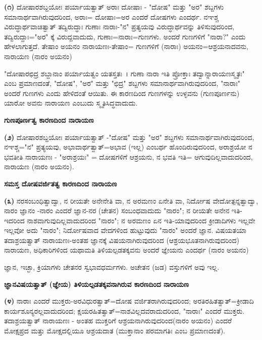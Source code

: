 \smallskip

\textbf{(೧)} ದೋಷಾರಶಬ್ದಯೋಃ ಪರ್ಯಾಯತ್ವಾತ್ ಅರಾಃ ದೋಷಾಃ - "ದೋಷ" ಮತ್ತು "ಅರ" ಶಬ್ದಗಳು ಸಮಾನಾರ್ಥವಾಗಿರುವುದರಿಂದ, ಅರಾಃ= ದೋಷಾಃ=ಅರ ಎಂದರೆ ದೋಷಗಳು ಎಂದರ್ಥ. ನಞಶ್ಚ ವಿರುದ್ಧಾರ್ಥವಾಚಿತ್ವಾತ್ ತದ್ವಿರುದ್ಧಾಃ ಗುಣಾಃ ನಾರಾಃ-\-"ನ" ಪ್ರತ್ಯಯವು ವಿರುದ್ಧಾರ್ಥವನ್ನು ತಿಳಿಸುವುದರಿಂದ, ತದ್ವಿರುದ್ದಾಃ="ಅರ" ಕ್ಕೆ ವಿರುದ್ದವಾದುದು, ಗುಣಾಃ=ನಾರಾಃ=ಗುಣಗಳು. ಅಂದರೆ ಗುಣಗಳಿಗೆ "ನಾರಾ?" ಎಂದು ಹೇಳಲಾಗುತ್ತದೆ. ತೇಷಾಂ ಅಯನಂ ನಾರಾಯಣಃ-ತೇಷಾಂ= ಗುಣಗಳಿಗೆ (ನಾರಾಃ) ಅಯನಂ=ಆಶ್ರಯನಾದವನು, ನಾರಾಯಣ (ನಾರಂ ಅಯನಂ)

"ದೋಷಾರಛಿದ್ರ ಶಬ್ದಾನಾಂ ಪರ್ಯಾಯತ್ವಂ ಯತಸ್ತತಃ~। ಗುಣಾ ನಾರಾ ಇತಿ ಪ್ರೋಕ್ತಾಃ ತದ್ವಾನ್ನಾರಾಯಣಸ್ಮೃತಃ" ಎಂಬ ಪ್ರಮಾಣದಂತೆ, "ದೋಷ", "ಅರ" ಮತ್ತು "ಛಿದ್ರ" ಶಬ್ದಗಳು ಸಮಾನಾರ್ಥವಾಗಿರುವುದರಿಂದ, "ನಾರಾಃ" ಅಂದರೆ ಗುಣಗಳು ಎಂದು ಹೇಳಿದಂತೆ ಆಯಿತು. ಈ ಕಾರಣದಿಂದ ಗುಣಗಳನ್ನು ಉಳ್ಳವನು (ಗುಣಪೂರ್ಣನು) ಯಾರೋ ಅವನು ನಾರಾಯಣ ಎಂಬುದು ಸ್ಮೃತಿಸಿದ್ಧವಾದುದು.

\begin{center}
\textbf{ಗುಣಪೂರ್ಣತ್ವ ಕಾರಣದಿಂದ ನಾರಾಯಣ}
\end{center}

\textbf{(೨)} ದೋಷಾರಶಬ್ದಯೋಃ ಪರ್ಯಾಯತ್ವಾತ್ -"ದೋಷ" ಮತ್ತು "ಅರ" ಶಬ್ದಗಳು ಸಮಾನಾರ್ಥವಾಗಿರುವುದರಿಂದ, ನಞಶ್ಚ="ನ" ಪ್ರತ್ಯಯವು, ಅಭಾವಾರ್ಥತ್ವಾತ್=ಅಭಾವ (ಇಲ್ಲ) ಎಂಬರ್ಥ ಹೊಂದಿರುವುದರಿಂದ, ಅರಾಶ್ರಯೋ ನ ಭವತೀತಿ ನಾರಾಯಣಃ - "ಅರಾಶ್ರಯಃ" = ದೋಷಗಳಿಗೆ ಆಶ್ರಯನು, ನ ಭವತಿ ಇತಿ= ಆಗುವುದಿಲ್ಲವಾದುದರಿಂದ, ನಾರಾಯಣ (ನಾರಂ ಅಯನಂ).

\begin{center}
\textbf{ಸಮಸ್ತ ದೋಷವರ್ಜಿತತ್ವ ಕಾರಣದಿಂದ ನಾರಾಯಣ}
\end{center}

\textbf{(೩)} ನರಸಂಬಂಧಿತ್ವಾದ್ವಾ, ನ ರೀಯತೇ ಅನೇನೇತಿ ವಾ, ನ ಅರಮಣಂ ಏನೇತಿ ವಾ, ನಿರ್ದೋಷ ವೇದೋತ್ಪನ್ನತ್ವಾದ್ವಾ, ನಾರಂ ಜ್ಞಾನಂ -ನಾರಂ ಎಂದರೆ ಜ್ಞಾನ-ನರ (ಚೇತನ) ಸಂಬಂಧವಾದುದು "ನಾರಂ"; ನ ರೀಯತೇ ಅನೇನ ಇತಿ-ಇದರಿಂದ ನಾಶವಾಗುವುದಿಲ್ಲವಾದುದರಿಂದ "ನಾರಂ"; ನ ಅರಮಣಂ ಏನ ಇತಿ-ಯಾವುದರಿಂದ ಕ್ರೀಡಾದಿಗಳು ಇಲ್ಲವೇ ಇಲ್ಲವೋ ಅದು "ನಾರಂ"; ನಿರ್ದೋಷವಾದ ವೇದಗಳಿಂದ ಹುಟ್ಟುವುದು "ನಾರಂ" ಅಂದರೆ ಜ್ಞಾನ. ವಿಷಯತಯಾ ತದಾಶ್ರಯತ್ವಾತ್ ನಾರಾಯಣಃ-ಅಂತಹ ಜ್ಞಾನಕ್ಕೆ ವಿಷಯನಾಗಿರುವುದರಿಂದ (ಆಶ್ರಯಭೂತನಾಗಿರುವುದರಿಂದ) ನಾರಾಯಣ, ಅಧಿಕಾರಿಗಳಿಂದ ಯಥಾಮತಿ ತಿಳಿಯಲ್ಪಡತಕ್ಕವನು ಅಂದರೆ ಜ್ಞೇಯನು ಎಂದರ್ಥ (ನಾರಂ ಅಯನಂ)

ಜ್ಞಾನ, ಇಚ್ಛಾ, ಕ್ರಿಯಾಗಳು ಚೇತನರ ಸ್ವಭಾವಧರ್ಮಗಳು. ಅಚೇತನ (ಜಡ) ವಸ್ತುಗಳಿಗೆ ಅವು ಇಲ್ಲ.

\newpage

\begin{center}
\textbf{ಜ್ಞಾನವಿಷಯತ್ವಾತ್ (ಜ್ಞೇಯ) ತಿಳಿಯಲ್ಪಡತಕ್ಕವನಾಗಿರುವ ಕಾರಣದಿಂದ ನಾರಾಯಣ}
\end{center}

\textbf{(೪)} ನಾರಾಃ ಎಂದರೆ ಮುಕ್ತರು-ಅರವಿಧುರತ್ವಾತ್=ದೋಷ ವರ್ಜಿತರಾಗಿರುವುದರಿಂದ; ಅರತಿರಹಿತತ್ವಾತ್=ಕ್ರೀಡಾದಿ ಕಾರ್ಯಶೂನ್ಯರಲ್ಲವಾದುದರಿಂದ; ಕ್ಷಯರಹಿತ\-ತ್ವಾತ್=ನಾಶ\-ವಿಲ್ಲದವರಾದುದರಿಂದ, "ನಾರಾಃ" ಎಂದರೆ ಮುಕ್ತರು. ತದಾಶ್ರಯತ್ವಾತ್ ನಾರಾಯಣಃ - ಅಂತಹ ಮುಕ್ತರಿಗೆ ಆಶ್ರಯನಾಗಿರುವುದರಿಂದ(ನಾರಂ ಅಯನಂ) ಎಂದರೆ ಮೋಕ್ಷಪ್ರದ ಮತ್ತು ಮೋಕ್ಷದಲ್ಲಿಯೂ ಆಶ್ರಯದಾತ (ಮುಕ್ತಾನಾಂ ಪರಮಾಗತಿಃ ಎಂಬ ಪ್ರಮಾಣದಂತೆ).

